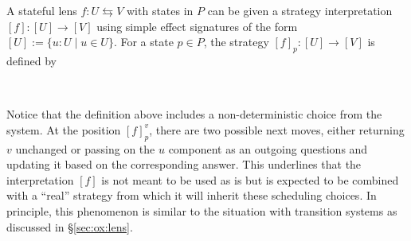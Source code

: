\begin{definition}
  \label{def:strat:stateful-lens}
  A stateful lens $f : U \leftrightarrows V$ with states in $P$
  can be given a strategy interpretation
  $[f] : [U] \rightarrow [V]$
  using simple effect signatures of the form
  $[U] := \{u : U \mid u \in U\}$.
  For a state $p \in P$,
  the strategy $[f]_p : [U] \rightarrow [V]$ is defined by
  \begin{center}
    \begin{prooftree}
    \end{prooftree}
    \qquad
    \begin{prooftree}
    \end{prooftree}
    \qquad
    \begin{prooftree}
    \end{prooftree}
    \qquad
    \begin{prooftree}
    \end{prooftree}
    \\
    \vspace{10pt}
    \begin{prooftree}
    \end{prooftree}
    \qquad
    \begin{prooftree}
    \end{prooftree}
  \end{center}
\end{definition}

Notice that the definition above
includes a non-deterministic choice from the system.
At the position $[f]^v_p$,
there are two possible next moves,
either returning $v$ unchanged
or passing on the $u$ component as an outgoing questions
and updating it based on the corresponding answer.
This underlines that the interpretation $[f]$
is not meant to be used as is
but is expected to be combined with a ``real'' strategy
from which it will inherit these scheduling choices.
In principle,
this phenomenon is similar to the situation with
transition systems as discussed in \S\ref{sec:ox:lens}.


